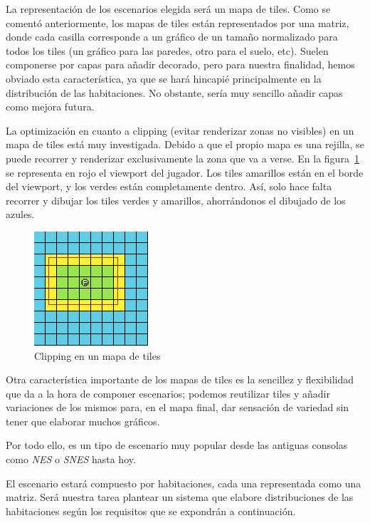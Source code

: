 La representación de los escenarios elegida será un mapa de tiles. Como se comentó anteriormente, los mapas de tiles están representados por una matriz, donde cada casilla corresponde a un gráfico de un tamaño normalizado para todos los tiles (un gráfico para las paredes, otro para el suelo, etc). Suelen componerse por capas para añadir decorado, pero para nuestra finalidad, hemos obviado esta característica, ya que se hará hincapié principalmente en la distribución de las habitaciones. No obstante, sería muy sencillo añadir capas como mejora futura.

La optimización en cuanto a clipping (evitar renderizar zonas no visibles) en un mapa de tiles está muy investigada. Debido a que el propio mapa es una rejilla, se puede recorrer y renderizar exclusivamente la zona que va a verse. En la figura~\ref{fig:tileclip} se representa en rojo el viewport del jugador. Los tiles amarillos están en el borde del viewport, y los verdes están completamente dentro. Así, solo hace falta recorrer y dibujar los tiles verdes y amarillos, ahorrándonos el dibujado de los azules.

\begin{figure}[t]
\centering
\includegraphics[scale=1]{img/tileclip}
\caption{Clipping en un mapa de tiles
\label{fig:tileclip}}
\end{figure}

Otra característica importante de los mapas de tiles es la sencillez y flexibilidad que da a la hora de componer escenarios; podemos reutilizar tiles y añadir variaciones de los mismos para, en el mapa final, dar sensación de variedad sin tener que elaborar muchos gráficos.

Por todo ello, es un tipo de escenario muy popular desde las antiguas consolas como \emph{NES} o \emph{SNES} hasta hoy.

El escenario estará compuesto por habitaciones, cada una representada como una matriz. Será nuestra tarea plantear un sistema que elabore distribuciones de las habitaciones según los requisitos que se expondrán a continuación.

